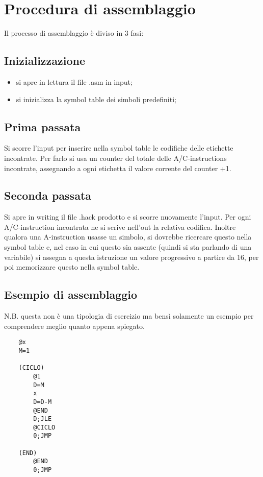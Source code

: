 \documentclass[12pt]{article}
\begin{document}
\section{Procedura di assemblaggio}
\label{sec:proc_assemblaggio}
Il processo di assemblaggio è diviso in 3 fasi:

\subsection{Inizializzazione}
\label{ssec:proc_init}
\begin{itemize}
    \item si apre in lettura il file .asm in input;
    \item si inizializza la symbol table dei simboli predefiniti;
\end{itemize}

\subsection{Prima passata}
\label{proc_first}
Si scorre l'input per inserire nella symbol table le codifiche delle etichette incontrate.
Per farlo si usa un counter del totale delle A/C-instructions incontrate, assegnando a ogni etichetta il valore corrente del counter +1.

\subsection{Seconda passata}
\label{proc_second}
Si apre in writing il file .hack prodotto e si scorre nuovamente l'input.
Per ogni A/C-instruction incontrata ne si scrive nell'out la relativa codifica.
Inoltre qualora una A-instruction usasse un simbolo, si dovrebbe ricercare questo nella symbol table e, nel caso in cui questo sia assente (quindi si sta parlando di una variabile) si assegna a questa istruzione un valore progressivo a partire da 16, per poi memorizzare questo nella symbol table. 

\subsection{Esempio di assemblaggio}
N.B. questa non è una tipologia di esercizio ma bensì solamente un esempio per comprendere meglio quanto appena spiegato.
\begin{lstlisting}
    @x
    M=1

    (CICLO)
        @1
        D=M
        x
        D=D-M
        @END
        D;JLE
        @CICLO
        0;JMP

    (END)
        @END
        0;JMP
\end{lstlisting}
\end{document}
